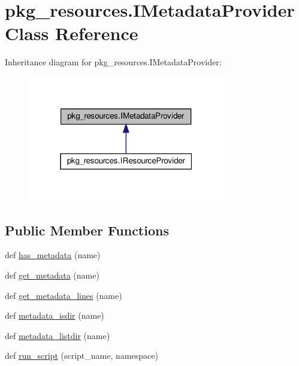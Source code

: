 \hypertarget{classpkg__resources_1_1IMetadataProvider}{}\section{pkg\+\_\+resources.\+I\+Metadata\+Provider Class Reference}
\label{classpkg__resources_1_1IMetadataProvider}


Inheritance diagram for pkg\+\_\+resources.\+I\+Metadata\+Provider\+:
\nopagebreak
\begin{figure}[H]
\begin{center}
\leavevmode
\includegraphics[width=244pt]{classpkg__resources_1_1IMetadataProvider__inherit__graph}
\end{center}
\end{figure}
\subsection*{Public Member Functions}
\begin{DoxyCompactItemize}
\item 
def \hyperlink{classpkg__resources_1_1IMetadataProvider_a15fde1a73abacbfc3cadbcf48e046537}{has\+\_\+metadata} (name)
\item 
def \hyperlink{classpkg__resources_1_1IMetadataProvider_ab7afa403d1009b693464e103d5bd763f}{get\+\_\+metadata} (name)
\item 
def \hyperlink{classpkg__resources_1_1IMetadataProvider_a54a382614fdde79c3dd5a0f1acfe6fe6}{get\+\_\+metadata\+\_\+lines} (name)
\item 
def \hyperlink{classpkg__resources_1_1IMetadataProvider_a00c65f8e870e2a8917366c2ccb4d3ef6}{metadata\+\_\+isdir} (name)
\item 
def \hyperlink{classpkg__resources_1_1IMetadataProvider_aa64f54075780aff08c98542a4883b3be}{metadata\+\_\+listdir} (name)
\item 
def \hyperlink{classpkg__resources_1_1IMetadataProvider_a8adadb1f0ba94514272df33f5ddda4d0}{run\+\_\+script} (script\+\_\+name, namespace)
\end{DoxyCompactItemize}


